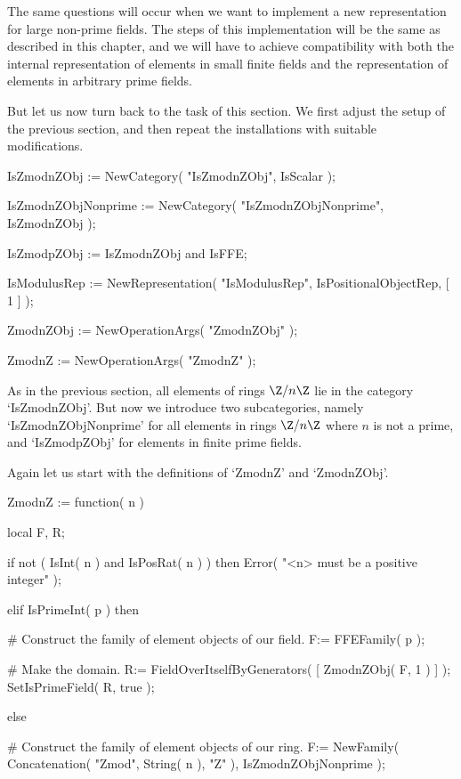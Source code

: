 The same questions will occur when we want to implement a new
representation for large non-prime fields.
The steps of this implementation will be the same as described in this
chapter,
and we will have to achieve compatibility with both the internal
representation of elements in small finite fields and the representation
of elements in arbitrary prime fields.

But let us now turn back to the task of this section.
We first adjust the setup of the previous section,
and then repeat the installations with suitable modifications.

\begintt
    IsZmodnZObj := NewCategory( "IsZmodnZObj", IsScalar );

    IsZmodnZObjNonprime := NewCategory( "IsZmodnZObjNonprime",
        IsZmodnZObj );

    IsZmodpZObj := IsZmodnZObj and IsFFE;

    IsModulusRep := NewRepresentation( "IsModulusRep",
        IsPositionalObjectRep,
        [ 1 ] );

    ZmodnZObj := NewOperationArgs( "ZmodnZObj" );

    ZmodnZ := NewOperationArgs( "ZmodnZ" );
\endtt

As in the previous section,
all elements of rings $\Z/n\Z$ lie in the category `IsZmodnZObj'.
But now we introduce two subcategories, namely `IsZmodnZObjNonprime'
for all elements in rings $\Z/n\Z$ where $n$ is not a prime,
and `IsZmodpZObj' for elements in finite prime fields.

Again let us start with the definitions of `ZmodnZ' and `ZmodnZObj'.

\begintt
    ZmodnZ := function( n )

        local F, R;

        if not ( IsInt( n ) and IsPosRat( n ) ) then
          Error( "<n> must be a positive integer" );

        elif IsPrimeInt( p ) then

          # Construct the family of element objects of our field.
          F:= FFEFamily( p );

          # Make the domain.
          R:= FieldOverItselfByGenerators( [ ZmodnZObj( F, 1 ) ] );
          SetIsPrimeField( R, true );

        else

          # Construct the family of element objects of our ring.
          F:= NewFamily( Concatenation( "Zmod", String( n ), "Z" ),
                         IsZmodnZObjNonprime );
  
